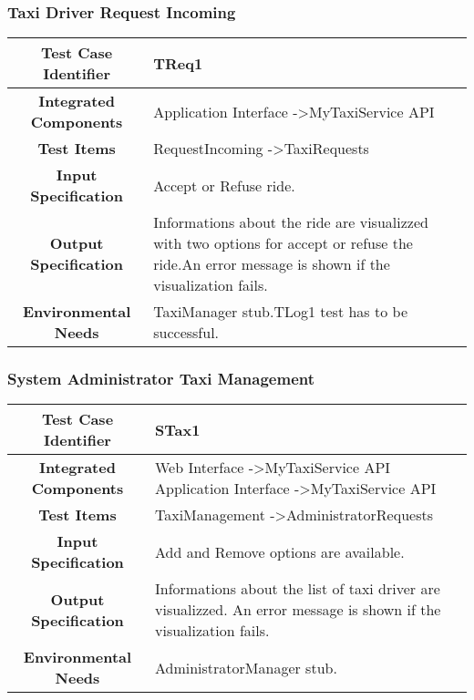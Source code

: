 \documentclass[11pt, a4paper,titlepage]{article}
\begin{document}
	\subsubsection{Taxi Driver Request Incoming}
	\begin{tabularx}{\textwidth}{| c|X|}
		\hline \textbf{Test Case Identifier} & TReq1 \\
		\hline \textbf{Integrated Components} & Application Interface -\textgreater MyTaxiService API \\
		\hline \textbf{Test Items} & RequestIncoming -\textgreater TaxiRequests \\
		\hline \textbf{Input Specification} & Accept or Refuse ride. \\
		\hline \textbf{Output Specification} & Informations about the ride are visualizzed with two options for accept or refuse the ride.\newline An error message is shown if the visualization fails. \\
		\hline \textbf{Environmental Needs} & TaxiManager stub.\newline TLog1  test has to be successful. \\
		\hline
	\end{tabularx}
	\newline
	\newline
	\subsubsection{System Administrator Taxi Management}
	\begin{tabularx}{\textwidth}{| c|X|}
		\hline \textbf{Test Case Identifier} & STax1 \\
		\hline \textbf{Integrated Components} & Web Interface -\textgreater MyTaxiService API \newline 
		Application Interface -\textgreater MyTaxiService API \\
		\hline \textbf{Test Items} & TaxiManagement -\textgreater AdministratorRequests \\
		\hline \textbf{Input Specification} & Add and Remove options are available. \\
		\hline \textbf{Output Specification} & Informations about the list of taxi driver are visualizzed.\newline
		An error message is shown if the visualization fails. \\
		\hline \textbf{Environmental Needs} & AdministratorManager stub. \\
		\hline
	\end{tabularx}
	\newline
	\newline
\end{document}
